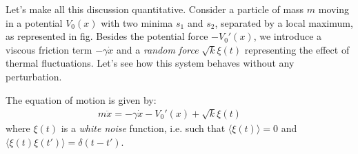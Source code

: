 \documentclass[../template.tex]{subfiles}
\begin{document}
Let's make all this discussion quantitative. Consider a particle of mass $m$ moving in a potential $V_0(x)$ with two minima $s_1$ and $s_2$, separated by a local maximum, as represented in fig. %
Besides the potential force $-V_0'(x)$, we introduce a viscous friction term $-\gamma \dot{x}$ and a \textit{random force} $\sqrt{k}\xi(t)$ representing the effect of thermal fluctuations. Let's see how this system behaves without any perturbation. 

The equation of motion is given by:
\begin{align*}
    m \ddot{x} = - \gamma \dot{x} - V_0'(x) + \sqrt{k}\xi(t) \qquad 
\end{align*} 
where $\xi(t)$ is a \textit{white noise} function, i.e. such that $\langle \xi(t) \rangle = 0$ and $\langle \xi(t) \xi(t') \rangle = \delta(t-t')$.
\end{document}
